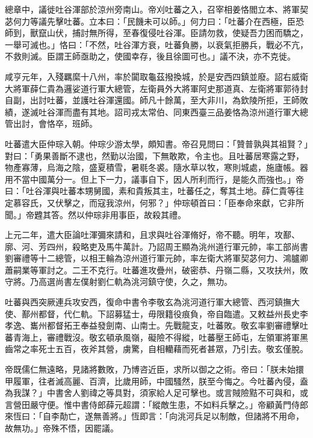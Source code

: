 \begin{pinyinscope}
 總章中，議徙吐谷渾部於涼州旁南山。帝刈吐蕃之入，召宰相姜恪閻立本、將軍契苾何力等議先擊吐蕃。立本曰：「民饑未可以師。」何力曰：「吐蕃介在西極，臣恐師到，獸竄山伏，捕討無所得，至春復侵吐谷渾。臣請勿救，使疑吾力困而驕之，一舉可滅也。」恪曰：「不然，吐谷渾方衰，吐蕃負勝，以衰氣拒勝兵，戰必不亢，不救則滅。臣謂王師亟助之，使國幸存，後且徐圖可也。」議不決，亦不克徙。



 咸亨元年，入殘羈縻十八州，率於闐取龜茲撥換城，於是安西四鎮並廢。詔右威衛大將軍薛仁貴為邏娑道行軍大總管，左衛員外大將軍阿史那道真、左衛將軍郭待封自副，出討吐蕃，並護吐谷渾還國。師凡十餘萬，至大非川，為欽陵所拒，王師敗績，遂滅吐谷渾而盡有其地。詔司戎太常伯、同東西臺三品姜恪為涼州道行軍大總管出討，會恪卒，班師。



 吐蕃遣大臣仲琮入朝。仲琮少游太學，頗知書。帝召見問曰：「贊普孰與其祖賢？」對曰：「勇果善斷不逮也，然勤以治國，下無敢欺，令主也。且吐蕃居寒露之野，物產寡薄，烏海之陰，盛夏積雪，暑毼冬裘。隨水草以牧，寒則城處，施廬帳。器用不當中國萬分一。但上下一力，議事自下，因人所利而行，是能久而強也。」帝曰：「吐谷渾與吐蕃本甥舅國，素和貴叛其主，吐蕃任之，奪其土地。薛仁貴等往定慕容氏，又伏擊之，而寇我涼州，何邪？」仲琮頓首曰：「臣奉命來獻，它非所聞。」帝韙其答。然以仲琮非用事臣，故殺其禮。



 上元二年，遣大臣論吐渾彌來請和，且求與吐谷渾脩好，帝不聽。明年，攻鄯、廓、河、芳四州，殺略吏及馬牛萬計。乃詔周王顯為洮州道行軍元帥，率工部尚書劉審禮等十二總管，以相王輪為涼州道行軍元帥，率左衛大將軍契苾何力、鴻臚卿蕭嗣業等軍討之。二王不克行。吐蕃進攻疊州，破密恭、丹嶺二縣，又攻扶州，敗守將。乃高選尚書左僕射劉仁軌為洮河鎮守使，久之，無功。



 吐蕃與西突厥連兵攻安西，復命中書令李敬玄為洮河道行軍大總管、西河鎮撫大使、鄯州都督，代仁軌。下詔募猛士，毋限籍役痕負，帝自臨遣。又敕益州長史李孝逸、巂州都督拓王奉益發劍南、山南士。先戰龍支，吐蕃敗。敬玄率劉審禮擊吐蕃青海上，審禮戰沒。敬玄頓承風嶺，礙險不得縱，吐蕃壓王師屯，左領軍將軍黑齒常之率死士五百，夜斧其營，虜驚，自相轥藉而死者甚眾，乃引去。敬玄僅脫。



 帝既儒仁無遠略，見諸將數敗，乃博咨近臣，求所以御之之術。帝曰：「朕未始擐甲履軍，往者滅高麗、百濟，比歲用師，中國騷然，朕至今悔之。今吐蕃內侵，盍為我謀？」中書舍人劉禕之等具對，須家給人足可擊也。或言賊險黠不可與和，或言營田嚴守便。惟中書侍郎薛元超謂：「縱敵生患，不如料兵擊之。」帝顧黃門侍郎來恆曰：「自李勣亡，遂無善將。」恆即言：「向洮河兵足以制敵，但諸將不用命，故無功。」帝殊不悟，因罷議。




\end{pinyinscope}
